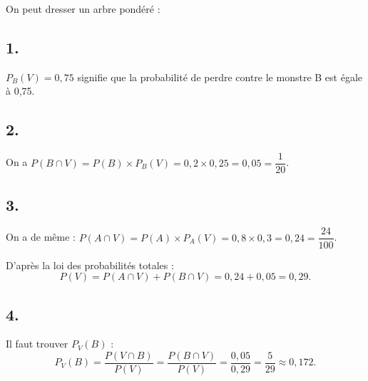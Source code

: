 On peut dresser un arbre pondéré :
	\begin{center}
\end{center}


	
	\subsection*{1.}
	
	\(P_B(V) = 0,75\) signifie que la probabilité de perdre contre le monstre B est égale à 0,75.
	
	\subsection*{2.}
	
	On a \(P(B \cap V) = P(B) \times P_B(V) = 0,2 \times 0,25 = 0,05 = \dfrac{1}{20}\).
	
	\subsection*{3.}
	
	On a de même : \(P(A \cap V) = P(A) \times P_A(V) = 0,8 \times 0,3 = 0,24 = \dfrac{24}{100}\).
	
	D'après la loi des probabilités totales :
	\[
	P(V) = P(A \cap V) + P(B \cap V) = 0,24 + 0,05 = 0,29.
	\]
	
	\subsection*{4.}
	
	Il faut trouver \(P_V(B)\) :
	\[
	P_V(B) = \dfrac{P(V \cap B)}{P(V)} = \dfrac{P(B \cap V)}{P(V)} = \dfrac{0,05}{0,29} = \dfrac{5}{29} \approx 0,172.
	\]
